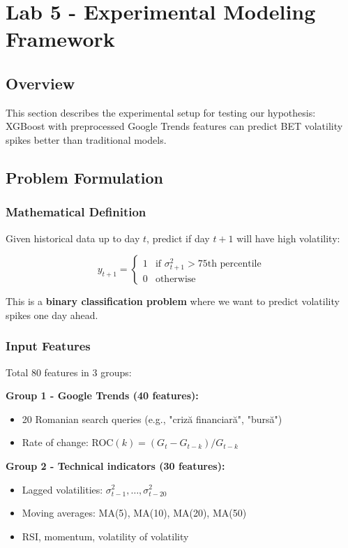 \documentclass[12pt,a4paper]{article}
\begin{document}
\newpage
\section{Lab 5 - Experimental Modeling Framework}

\subsection{Overview}

This section describes the experimental setup for testing our hypothesis: XGBoost with preprocessed Google Trends features can predict BET volatility spikes better than traditional models.

\subsection{Problem Formulation}

\subsubsection{Mathematical Definition}

Given historical data up to day $t$, predict if day $t+1$ will have high volatility:

\begin{equation}
y_{t+1} = \begin{cases}
1 & \text{if } \sigma_{t+1}^2 > \text{75th percentile} \\
0 & \text{otherwise}
\end{cases}
\end{equation}

This is a \textbf{binary classification problem} where we want to predict volatility spikes one day ahead.

\subsubsection{Input Features}

Total 80 features in 3 groups:

\textbf{Group 1 - Google Trends (40 features):}
\begin{itemize}
    \item 20 Romanian search queries (e.g., "criză financiară", "bursă")
    \item Rate of change: ROC$(k) = (G_t - G_{t-k}) / G_{t-k}$
\end{itemize}

\textbf{Group 2 - Technical indicators (30 features):}
\begin{itemize}
    \item Lagged volatilities: $\sigma_{t-1}^2, \ldots, \sigma_{t-20}^2$
    \item Moving averages: MA(5), MA(10), MA(20), MA(50)
    \item RSI, momentum, volatility of volatility
\end{itemize}
\end{document}

